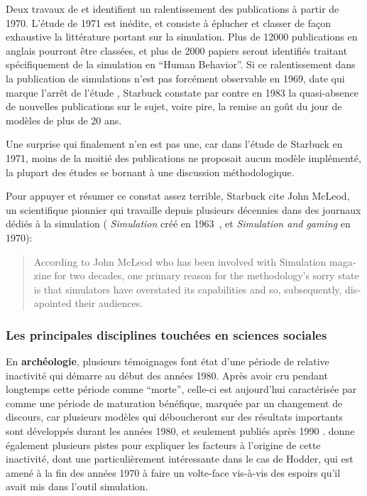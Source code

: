 Deux travaux de \textcite{Dutton1971} et \textcite{Starbuck1983} identifient un ralentissement des publications à partir de 1970. L'étude de 1971 est inédite, et consiste à éplucher et classer de façon exhaustive la littérature portant sur la simulation. Plus de 12000 publications en anglais pourront être classées, et plus de 2000 papiers seront identifiés traitant spécifiquement de la simulation en \foreignquote{english}{Human Behavior}. Si ce ralentissement dans la publication de simulations n'est pas forcément observable en 1969, date qui marque l'arrêt de l'étude , Starbuck constate par contre en 1983 la quasi-absence de nouvelles publications sur le sujet, voire pire, la remise au goût du jour de modèles de plus de 20 ans.

Une surprise qui finalement n'en est pas une, car dans l'étude de Starbuck en 1971, moins de la moitié des publications ne proposait aucun modèle implémenté, la plupart des études se bornant à une discussion méthodologique.

Pour appuyer et résumer ce constat assez terrible, Starbuck cite John McLeod, un scientifique pionnier qui travaille depuis plusieurs décennies dans des journaux dédiés à la simulation ( \textit{Simulation} créé en 1963 , et \textit{Simulation and gaming} en 1970):

\foreignblockquote{english}[\cite{Starbuck1983}]{According to  John McLeod who has been involved with Simulation magazine for two decades, one primary reason for the methodology's sorry state is that simulators have overstated its capabilities and so, subsequently, disapointed their audiences.}

\subsubsection{Les principales disciplines touchées en sciences sociales}
\label{ssec:disciplines_touches}

En \textbf{archéologie}, plusieurs témoignages \autocite[6-7]{Lake2013} font état d'une période de relative inactivité  qui démarre au début des années 1980. Après avoir cru pendant longtemps cette période comme \enquote{morte}, celle-ci est aujourd'hui caractérisée par \textcite{Lake2013} comme une période de maturation bénéfique, marquée par un changement de discours, car plusieurs modèles qui déboucheront sur des résultats importants sont développés durant les années 1980, et seulement publiés après 1990 . \textcite{Lake2013} donne également plusieurs pistes pour expliquer les facteurs à l'origine de cette inactivité, dont une particulièrement intéressante dans le cas de Hodder, qui est amené à la fin des années 1970 à faire un volte-face vis-à-vis des espoirs qu'il avait mis dans l'outil simulation.

